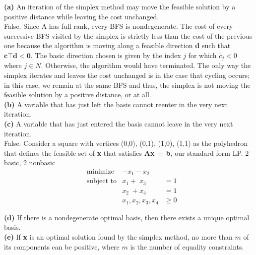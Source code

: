 \documentclass{article}
\begin{document}
\noindent
\textbf{(a)} An iteration of the simplex method may move the feasible solution by a positive distance while leaving the cost unchanged. \\

\noindent
False.  Since A has full rank, every BFS is nondegenerate.  The cost of every successive BFS visited by the simplex is strictly less than the cost of the previous one because the algorithm is moving along a feasible direction \textbf{d} such that $\mathbf{c\top d < 0}$.  The basic direction chosen is given by the index $j$ for which $\bar{c}_j < 0$ where $j \in N$. Otherwise, the algorithm would have terminated.  The only way the simplex iterates and leaves the cost unchanged is in the case that cycling occurs; in this case, we remain at the same BFS and thus, the simplex is not moving the feasible solution by a positive distance, or at all. \\

\noindent
\textbf{(b)} A variable that has just left the basis cannot reenter in the very next iteration. \\


\noindent
\textbf{(c)} A variable that has just entered the basis cannot leave in the very next iteration.\\

\noindent
False.  Consider a square with vertices (0,0), (0,1), (1,0), (1,1) as the polyhedron that defines the feasible set of \textbf{x} that satisfies \textbf{Ax = b}, our standard form LP.  2 basic, 2 nonbasic  \\

\begin{equation*}
\begin{aligned}
& \text{minimize} & -x_1 - x_2 &\\
& \text{subject to} &  x_1 + \;x_3 \; & = 1 \\
& 			&        x_2 \; + x_4 & = 1 \\
& 			&	x_1, x_2, x_3, x_4 & \geq 0
\end{aligned}
\end{equation*}

\noindent
\textbf{(d)} If there is a nondegenerate optimal basis, then there exists a unique optimal basis.\\

\noindent
\textbf{(e)} If \textbf{x} is an optimal solution found by the simplex method, no more than $m$ of its components can be positive, where $m$ is the number of equality constraints.\\
\end{document}
